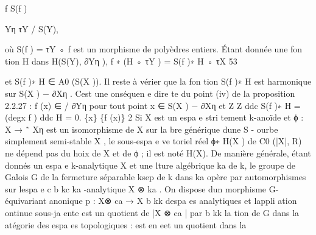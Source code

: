 \documentclass[
  10pt,
]{article}
\newenvironment{Shaded}{}{}
\newcommand{\NormalTok}[1]{#1}
\begin{document}
\begin{Shaded}
\begin{Highlighting}[]
\NormalTok{                                       f                            S(f )}
                                                           
\NormalTok{                                       Yη           τY}
\NormalTok{                                                         / S(Y),}

\NormalTok{où S(f ) = τY ◦ f est un morphisme de polyèdres entiers.}
\NormalTok{  Étant donnée une fon tion H dans H(S(Y), ∂Yη ),}
\NormalTok{                                  f ∗ (H ◦ τY ) = S(f )∗ H ◦ τX}
\NormalTok{                                                                                                53}



\NormalTok{et S(f )∗ H ∈ A0 (S(X )). Il reste à vérier que la fon tion S(f )∗ H est harmonique sur S(X ) −}
\NormalTok{∂Xη . C\textquotesingle{}est une onséquen e dire te du point (iv) de la proposition 2.2.27 : f (x) ∈ / ∂Yη pour}
\NormalTok{tout point x ∈ S(X ) − ∂Xη et}
\NormalTok{                         Z                              Z}
\NormalTok{                               ddc S(f )∗ H = (degx f )       ddc H = 0.}
\NormalTok{                          \{x\}                             \{f (x)\}}
\NormalTok{                                                                                                 2}
\NormalTok{  Si X est un espa e stri tement k{-}anoïde et ϕ : X → ˜ Xη est un isomorphisme de X sur la}
\NormalTok{bre générique d\textquotesingle{}une S {-} ourbe simplement semi{-}stable X , le sous{-}espa e ve toriel réel ϕ∗ H(X )}
\NormalTok{de C0 (|X|, R) ne dépend pas du hoix de X et de ϕ ; il est noté H(X).}
\NormalTok{   De manière générale, étant donnés un espa e k{-}analytique X et une lture algébrique ka de}
\NormalTok{k, le groupe de Galois G de la fermeture séparable ksep de k dans ka opère par automorphismes}
\NormalTok{sur l\textquotesingle{}espa e c                b kc}
\NormalTok{             ka {-}analytique X ⊗  ka . On dispose d\textquotesingle{}un morphisme G{-}équivariant anonique}
\NormalTok{                                          p : X⊗  ca → X}
\NormalTok{                                               b kk}
\NormalTok{d\textquotesingle{}espa es analytiques et l\textquotesingle{}appli ation ontinue sous{-}ja ente est un quotient de |X ⊗        ca | par}
\NormalTok{                                                                                        b kk}
\NormalTok{l\textquotesingle{}a tion de G dans la atégorie des espa es topologiques : \textquotesingle{}est en eet un quotient dans la}

\end{Highlighting}
\end{Shaded}
\end{document}
